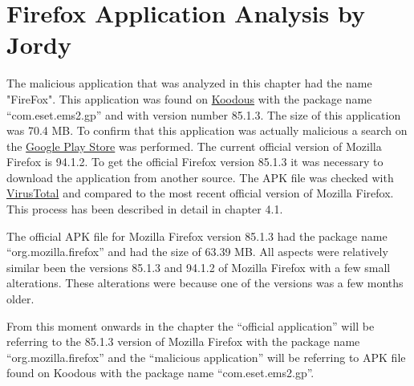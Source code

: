 \section{Firefox Application Analysis by Jordy}
The malicious application that was analyzed in this chapter had the name "FireFox".
This application was found on \href{https://koodous.com/apks/26a7576cc1182bf90fb16c3320d12a736b3faa10c158755605f36daae4b197b7}{Koodous} with the package name “com.eset.ems2.gp” and with version number 85.1.3.
The size of this application was 70.4 MB.
To confirm that this application was actually malicious a search on the \href{https://play.google.com/store/apps/details?id=org.mozilla.firefox&hl=nl&gl=US}{Google Play Store} was performed.
The current official version of Mozilla Firefox is 94.1.2.
To get the official Firefox version 85.1.3 it was necessary to download the application from another source.
The APK file was checked with \href{https://www.virustotal.com/gui/file/59ce0f9ea256b4576f391d01c685ced2db224a252bf09c3f362e6859a6c7ead5/details}{VirusTotal} and compared to the most recent official version of Mozilla Firefox.
This process has been described in detail in chapter 4.1.

The official APK file for Mozilla Firefox version 85.1.3 had the package name “org.mozilla.firefox” and had the size of 63.39 MB.
All aspects were relatively similar been the versions 85.1.3 and 94.1.2 of Mozilla Firefox with a few small alterations.
These alterations were because one of the versions was a few months older.

From this moment onwards in the chapter the “official application” will be referring to the 85.1.3 version of Mozilla Firefox with the package name “org.mozilla.firefox” and the “malicious application” will be referring to APK file found on Koodous with the package name “com.eset.ems2.gp”.